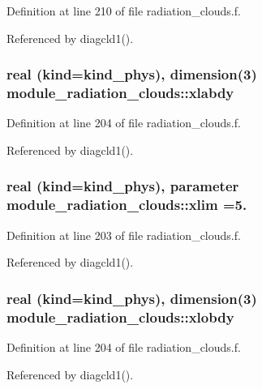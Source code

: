 Definition at line 210 of file radiation\+\_\+clouds.\+f.



Referenced by diagcld1().

\subsubsection[{\texorpdfstring{xlabdy}{xlabdy}}]{\setlength{\rightskip}{0pt plus 5cm}real (kind=kind\+\_\+phys), dimension(3) module\+\_\+radiation\+\_\+clouds\+::xlabdy\hspace{0.3cm}{\ttfamily [private]}}\hypertarget{group__module__radiation__clouds_gab2a798da0bb0125d1d5074b73c5951dc}{}\label{group__module__radiation__clouds_gab2a798da0bb0125d1d5074b73c5951dc}


Definition at line 204 of file radiation\+\_\+clouds.\+f.



Referenced by diagcld1().

\subsubsection[{\texorpdfstring{xlim}{xlim}}]{\setlength{\rightskip}{0pt plus 5cm}real (kind=kind\+\_\+phys), parameter module\+\_\+radiation\+\_\+clouds\+::xlim =5.\hspace{0.3cm}{\ttfamily [private]}}\hypertarget{group__module__radiation__clouds_ga1146f43b680b655d354a9c031ee4a463}{}\label{group__module__radiation__clouds_ga1146f43b680b655d354a9c031ee4a463}


Definition at line 203 of file radiation\+\_\+clouds.\+f.



Referenced by diagcld1().

\subsubsection[{\texorpdfstring{xlobdy}{xlobdy}}]{\setlength{\rightskip}{0pt plus 5cm}real (kind=kind\+\_\+phys), dimension(3) module\+\_\+radiation\+\_\+clouds\+::xlobdy\hspace{0.3cm}{\ttfamily [private]}}\hypertarget{group__module__radiation__clouds_gaab28f783919380e5ff7f925f70355a57}{}\label{group__module__radiation__clouds_gaab28f783919380e5ff7f925f70355a57}


Definition at line 204 of file radiation\+\_\+clouds.\+f.



Referenced by diagcld1().

